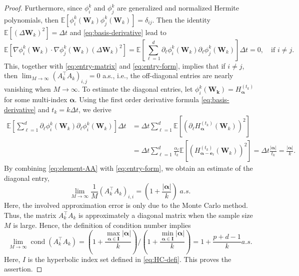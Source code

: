 \documentclass[10pt,a4paper]{amsart}
\numberwithin{equation}{section}
\numberwithin{algorithm}{section}
\theoremstyle{plain}
\theoremstyle{remark}
\newcommand{\bE}{\mathbb{E}}
\begin{document}
\begin{proof}
Furthermore, since $\phi_i^k$ and $\phi_j^k$ are generalized and normalized Hermite polynomials, then $\mathbb{E}[\phi_i^k(\mathbf{W}_k)\phi_j^k(\mathbf{W}_k)] = \delta_{ij}$. Then the identity $\mathbb{E}[(\Delta \mathbf{W}_k)^2] = \Delta t$ and \eqref{eq:basis-derivative} lead to 
\begin{equation*}
    \mathbb{E}[\nabla \phi_i^k(\mathbf{W}_k)\cdot\nabla\phi_j^k(\mathbf{W}_k) (\Delta \mathbf{W}_k)^2] = \bE\left[\sum_{\ell = 1}^d \partial_\ell \phi_i^k(\mathbf{W}_k)\partial_\ell \phi_j^k(\mathbf{W}_k)\right]\Delta t = 0,\quad \text{if }i\ne j.
\end{equation*}
This, together with \eqref{eq:entry-matrix} and \eqref{eq:entry-form}, implies that if $i\ne j$, then $\lim_{M\to\infty}(A_k^\top A_k)_{i,j} = 0$ a.s., i.e., the off-diagonal entries are nearly vanishing when $M\to \infty$.
To estimate the diagonal entries, let $\phi_i^k(\mathbf{W_k}) = H_{\bm{\alpha}}^{(t_k)}$ for some multi-index $\bm{\alpha}$. Using the first order derivative formula \eqref{eq:basis-derivative} and $t_k = k\Delta t$, we derive 
\begin{equation} \label{eq:element-AA}
    \begin{aligned}
        \bE\left[\sum_{\ell = 1}^d \partial_\ell \phi_i^k(\mathbf{W}_k)\partial_\ell \phi_i^k(\mathbf{W}_k)\right]\Delta t &= \Delta t\sum_{\ell = 1}^d \bE\left[ \left(\partial_\ell H_{\bm{\alpha}}^{(t_k)}(\mathbf{W}_k)\right)^2 \right] \\
        &=\Delta t\sum_{\ell = 1}^d \frac{\alpha_\ell}{t_k}\bE\left[ \left( H_{\bm{\alpha} - \mathbf{e}_\ell}^{(t_k)}(\mathbf{W}_k) \right)^2 \right] = \Delta t\frac{|\bm{\alpha}|}{t_k} = \frac{|\bm{\alpha}|}{k}.
    \end{aligned}
\end{equation}
By combining \eqref{eq:element-AA} with \eqref{eq:entry-form}, we obtain an estimate of the diagonal entry, \[\lim_{M\to\infty}\frac{1}{M}(A_k^\top A_k)_{i,i}= (1 + \frac{|\bm{\alpha}|}{k})\; a.s.
\] Here, the involved approximation error is only due to the Monte Carlo method. Thus, the matrix $A_k^\top A_k$ is approximately a diagonal matrix when the sample size $M$ is large. Hence, the definition of condition number implies
\begin{equation*}
     \lim_{M\to\infty}\operatorname{cond}(A_k^\top A_k)=\left(1 + \frac{\max_{\bm{\alpha \in I}}|\bm{\alpha}|}{k}\right) \Big/ \left(1 + \frac{\min_{\bm{\alpha \in I}}|\bm{\alpha}|}{k}\right) = 1 + \frac{p+d-1}{k} a.s.
\end{equation*}
Here, $I$ is the hyperbolic index set defined in \eqref{eq:HC-defi}. This proves the assertion.
\end{proof}
\end{document}
